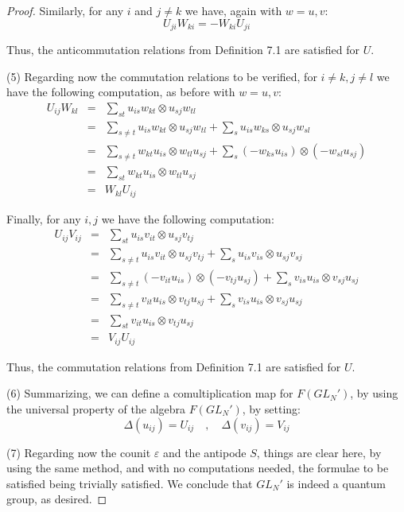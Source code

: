 \documentclass[12pt]{amsbook}
\begin{document}
\begin{proof}
Similarly, for any $i$ and $j\neq k$ we have, again with $w=u,v$:
$$U_{ji}W_{ki}=-W_{ki}U_{ji}$$

Thus, the anticommutation relations from Definition 7.1 are satisfied for $U$. 

\medskip

(5) Regarding now the commutation relations to be verified, for $i\neq k,j\neq l$ we have the following computation, as before with $w=u,v$:
\begin{eqnarray*}
U_{ij}W_{kl}
&=&\sum_{st}u_{is}w_{kt}\otimes u_{sj}w_{tl}\\
&=&\sum_{s\neq t}u_{is}w_{kt}\otimes u_{sj}w_{tl}+\sum_su_{is}w_{ks}\otimes u_{sj}w_{sl}\\
&=&\sum_{s\neq t}w_{kt}u_{is}\otimes w_{tl}u_{sj}+\sum_s(-w_{ks}u_{is})\otimes(-w_{sl}u_{sj})\\
&=&\sum_{st}w_{kt}u_{is}\otimes w_{tl}u_{sj}\\
&=&W_{kl}U_{ij}
\end{eqnarray*}

Finally, for any $i,j$ we have the following computation:
\begin{eqnarray*}
U_{ij}V_{ij}
&=&\sum_{st}u_{is}v_{it}\otimes u_{sj}v_{tj}\\
&=&\sum_{s\neq t}u_{is}v_{it}\otimes u_{sj}v_{tj}+\sum_su_{is}v_{is}\otimes u_{sj}v_{sj}\\
&=&\sum_{s\neq t}(-v_{it}u_{is})\otimes(-v_{tj}u_{sj})+\sum_sv_{is}u_{is}\otimes v_{sj}u_{sj}\\
&=&\sum_{s\neq t}v_{it}u_{is}\otimes v_{tj}u_{sj}+\sum_sv_{is}u_{is}\otimes v_{sj}u_{sj}\\
&=&\sum_{st}v_{it}u_{is}\otimes v_{tj}u_{sj}\\
&=&V_{ij}U_{ij}
\end{eqnarray*}

Thus, the commutation relations from Definition 7.1 are satisfied for $U$. 

\medskip

(6) Summarizing, we can define a comultiplication map for $F(GL_N')$, by using the universal property of the algebra $F(GL_N')$, by setting:
$$\Delta(u_{ij})=U_{ij}\quad,\quad\Delta(v_{ij})=V_{ij}$$

(7) Regarding now the counit $\varepsilon$ and the antipode $S$, things are clear here, by using the same method, and with no computations needed, the formulae to be satisfied being trivially satisfied. We conclude that $GL_N'$ is indeed a quantum group, as desired.
\end{proof}
\end{document}
